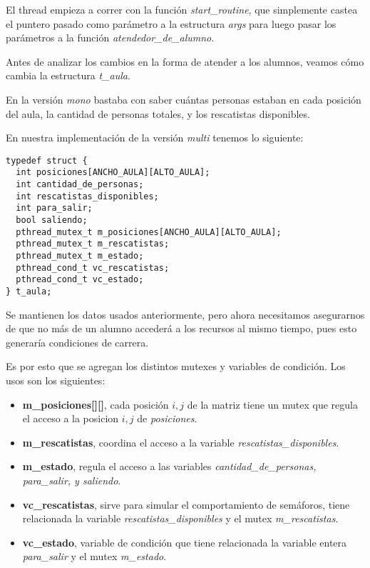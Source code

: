 \documentclass[a4paper]{article}
\begin{document}
El thread empieza a correr con la función \textit{start\_routine}, que
simplemente castea el puntero pasado como parámetro a la estructura
\textit{args} para luego pasar los parámetros a la función
\textit{atendedor\_de\_alumno}.

Antes de analizar los cambios en la forma de atender a los alumnos, veamos
cómo cambia la estructura \textit{t\_aula}.

En la versión \textit{mono} bastaba con saber cuántas personas estaban en
cada posición del aula, la cantidad de personas totales, y los rescatistas
disponibles.

En nuestra implementación de la versión \textit{multi} tenemos lo siguiente:
\begin{verbatim}
typedef struct {
  int posiciones[ANCHO_AULA][ALTO_AULA];
  int cantidad_de_personas;
  int rescatistas_disponibles;
  int para_salir;
  bool saliendo;
  pthread_mutex_t m_posiciones[ANCHO_AULA][ALTO_AULA];
  pthread_mutex_t m_rescatistas;
  pthread_mutex_t m_estado;
  pthread_cond_t vc_rescatistas;
  pthread_cond_t vc_estado;
} t_aula;
\end{verbatim}

Se mantienen los datos usados anteriormente, pero ahora necesitamos
asegurarnos de que no más de un alumno accederá a los recursos al mismo
tiempo, pues esto generaría condiciones de carrera.

Es por esto que se agregan los distintos mutexes y variables de condición. Los usos son los siguientes:

\begin{itemize}
\item \textbf{m\_posiciones[][]}, cada posición $i,j$ de la matriz tiene un
mutex que regula el acceso a la posicion $i,j$ de \textit{posiciones}.
\item \textbf{m\_rescatistas}, coordina el acceso a la variable
\textit{rescatistas\_disponibles}.
\item \textbf{m\_estado}, regula el acceso a las variables
\textit{cantidad\_de\_personas, para\_salir, y saliendo}.
\item \textbf{vc\_rescatistas}, sirve para simular el comportamiento de
semáforos, tiene relacionada la variable \textit{rescatistas\_disponibles} y
el mutex \textit{m\_rescatistas}.
\item \textbf{vc\_estado}, variable de condición que tiene relacionada la
variable entera \textit{para\_salir} y el mutex \textit{m\_estado}.
\end{itemize}
\end{document}
